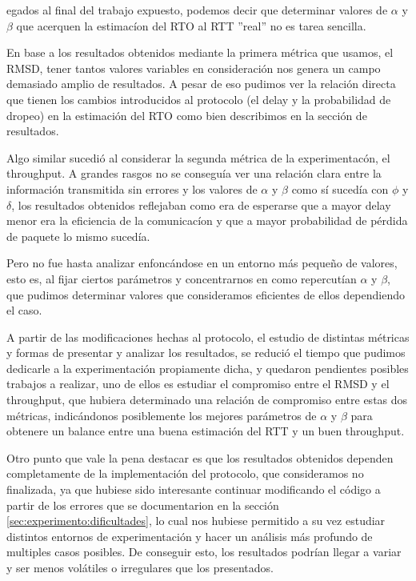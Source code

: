 egados al final del trabajo expuesto, podemos decir que determinar valores 
de $\alpha$ y $\beta$ que acerquen la estimac\'ion del RTO al RTT ''real'' no es tarea sencilla.

\par En base a los resultados obtenidos mediante la primera m\'etrica que usamos, el RMSD, tener 
tantos valores variables en consideraci\'on nos genera un campo demasiado amplio de resultados.
A pesar de eso pudimos ver la relaci\'on directa que tienen los cambios introducidos al
protocolo (el delay y la probabilidad de dropeo) en la estimaci\'on del RTO como bien describimos
en la secci\'on de resultados.

\par Algo similar sucedi\'o al considerar la segunda m\'etrica de la experimentac\'on, el throughput.
A grandes rasgos no se consegu\'ia ver una relaci\'on clara entre la informaci\'on transmitida sin
errores y los valores de $\alpha$ y $\beta$ como s\'i suced\'ia con $\phi$ y $\delta$, los resultados 
obtenidos reflejaban como era de esperarse que a mayor delay menor era la eficiencia de la comunicac\'ion 
y que a mayor probabilidad de p\'erdida de paquete lo mismo suced\'ia.


\par Pero no fue hasta analizar enfonc\'andose en un entorno m\'as peque\~no de valores, esto es,
al fijar ciertos par\'ametros y concentrarnos en como repercut\'ian $\alpha$ y $\beta$, que pudimos 
determinar valores que consideramos eficientes de ellos dependiendo el caso.

\par A partir de las modificaciones hechas al protocolo, el estudio de distintas m\'etricas y formas de
presentar y analizar los resultados, se reduci\'o el tiempo que pudimos dedicarle a la experimentaci\'on
propiamente dicha, y quedaron pendientes posibles trabajos a realizar, uno de ellos es estudiar el
compromiso entre el RMSD y el throughput, que hubiera determinado una relaci\'on
de compromiso entre estas dos m\'etricas, indic\'andonos posiblemente los
mejores par\'ametros de $\alpha$ y $\beta$ para obtenere un balance entre una
buena estimaci\'on del RTT y un buen throughput.

\par Otro punto que vale la pena destacar es que los resultados obtenidos dependen completamente de la 
implementaci\'on del protocolo, que consideramos no finalizada, ya que hubiese sido interesante
continuar modificando el c\'odigo a partir de los errores que se documentarion en la secci\'on 
\ref{sec:experimento:dificultades}, lo cual nos hubiese permitido 
a su vez estudiar distintos entornos de experimentaci\'on y hacer un an\'alisis m\'as profundo de 
multiples casos posibles. De conseguir esto, los resultados podr\'ian llegar a variar y ser
menos vol\'atiles o irregulares que los presentados.

